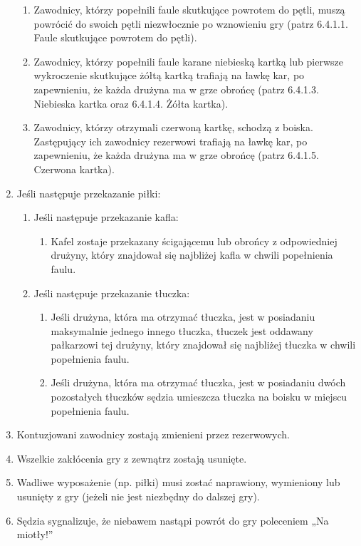 \documentclass[12pt]{article}
\begin{document}
\begin{enumerate}
  \begin{enumerate}
  \item
        Zawodnicy, którzy popełnili faule skutkujące powrotem do pętli,
    muszą powrócić do swoich pętli niezwłocznie po wznowieniu gry (patrz
    6.4.1.1. Faule skutkujące powrotem do pętli).
      \item
        Zawodnicy, którzy popełnili faule karane niebieską kartką lub
    pierwsze wykroczenie skutkujące żółtą kartką trafiają na ławkę kar,
    po zapewnieniu, że każda drużyna ma w grze obrońcę (patrz 6.4.1.3.
    Niebieska kartka oraz 6.4.1.4. Żółta kartka).
      \item
        Zawodnicy, którzy otrzymali czerwoną kartkę, schodzą z boiska.
    Zastępujący ich zawodnicy rezerwowi trafiają na ławkę kar, po
    zapewnieniu, że każda drużyna ma w grze obrońcę (patrz 6.4.1.5.
    Czerwona kartka).
      \end{enumerate}
\item
    Jeśli następuje przekazanie piłki:
  
  \begin{enumerate}
  \item
        Jeśli następuje przekazanie kafla:
    
    \begin{enumerate}
    \item
            Kafel zostaje przekazany ścigającemu lub obrońcy z odpowiedniej
      drużyny, który znajdował się najbliżej kafla w chwili popełnienia
      faulu.
          \end{enumerate}
  \item
        Jeśli następuje przekazanie tłuczka:
    
    \begin{enumerate}
    \item
            Jeśli drużyna, która ma otrzymać tłuczka, jest w posiadaniu
      maksymalnie jednego innego tłuczka, tłuczek jest oddawany
      pałkarzowi tej drużyny, który znajdował się najbliżej tłuczka w
      chwili popełnienia faulu.
          \item
            Jeśli drużyna, która ma otrzymać tłuczka, jest w posiadaniu dwóch
      pozostałych tłuczków sędzia umieszcza tłuczka na boisku w miejscu
      popełnienia faulu.
          \end{enumerate}
  \end{enumerate}
\item
    Kontuzjowani zawodnicy zostają zmienieni przez rezerwowych.
  \item
    Wszelkie zakłócenia gry z zewnątrz zostają usunięte.
  \item
    Wadliwe wyposażenie (np. piłki) musi zostać naprawiony, wymieniony lub
  usunięty z gry (jeżeli nie jest niezbędny do dalszej gry).
  \item
    Sędzia sygnalizuje, że niebawem nastąpi powrót do gry poleceniem „Na
  miotły!''
  

\end{enumerate}
\end{document}
